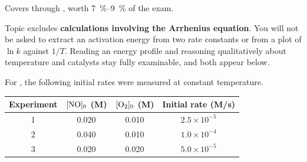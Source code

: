 \documentclass{apchem-exam}
\begin{document}
\apctitleblock

\begin{apcnote}
Covers  through , worth
\SI{7}{\percent}--\SI{9}{\percent} of the exam.

Topic  excludes \textbf{calculations involving the Arrhenius
equation}. You will not be asked to extract an activation energy from two
rate constants or from a plot of $\ln k$ against $1/T$. Reading an energy
profile and reasoning qualitatively about temperature and catalysts stay
fully examinable, and both appear below.
\end{apcnote}



For , the following initial rates were
measured at constant temperature.

\begin{center}
\begin{tabular}{cccc}
\hline
\textbf{Experiment} & $[\ce{NO}]_0$ (M) & $[\ce{O2}]_0$ (M) &
\textbf{Initial rate} (M/s) \\
\hline
1 & 0.020 & 0.010 & $2.5\times10^{-5}$ \\
2 & 0.040 & 0.010 & $1.0\times10^{-4}$ \\
3 & 0.020 & 0.020 & $5.0\times10^{-5}$ \\
\hline
\end{tabular}
\end{center}
\end{document}
